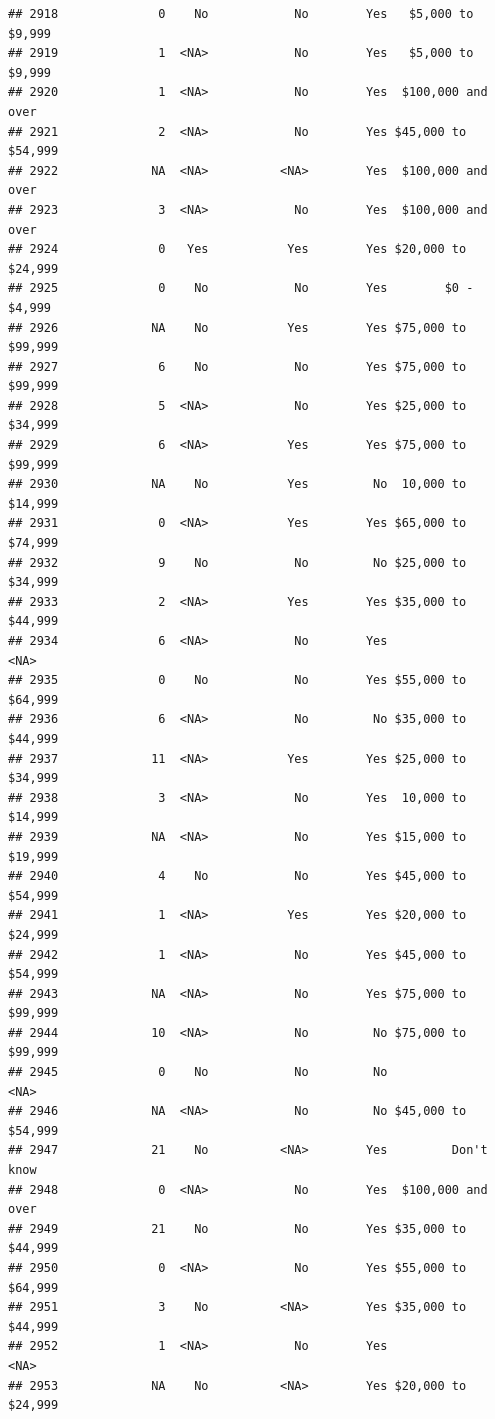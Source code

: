 \documentclass[man]{apa6}
\begin{document}
\begin{verbatim}
## 2918              0    No            No        Yes   $5,000 to $9,999
## 2919              1  <NA>            No        Yes   $5,000 to $9,999
## 2920              1  <NA>            No        Yes  $100,000 and over
## 2921              2  <NA>            No        Yes $45,000 to $54,999
## 2922             NA  <NA>          <NA>        Yes  $100,000 and over
## 2923              3  <NA>            No        Yes  $100,000 and over
## 2924              0   Yes           Yes        Yes $20,000 to $24,999
## 2925              0    No            No        Yes        $0 - $4,999
## 2926             NA    No           Yes        Yes $75,000 to $99,999
## 2927              6    No            No        Yes $75,000 to $99,999
## 2928              5  <NA>            No        Yes $25,000 to $34,999
## 2929              6  <NA>           Yes        Yes $75,000 to $99,999
## 2930             NA    No           Yes         No  10,000 to $14,999
## 2931              0  <NA>           Yes        Yes $65,000 to $74,999
## 2932              9    No            No         No $25,000 to $34,999
## 2933              2  <NA>           Yes        Yes $35,000 to $44,999
## 2934              6  <NA>            No        Yes               <NA>
## 2935              0    No            No        Yes $55,000 to $64,999
## 2936              6  <NA>            No         No $35,000 to $44,999
## 2937             11  <NA>           Yes        Yes $25,000 to $34,999
## 2938              3  <NA>            No        Yes  10,000 to $14,999
## 2939             NA  <NA>            No        Yes $15,000 to $19,999
## 2940              4    No            No        Yes $45,000 to $54,999
## 2941              1  <NA>           Yes        Yes $20,000 to $24,999
## 2942              1  <NA>            No        Yes $45,000 to $54,999
## 2943             NA  <NA>            No        Yes $75,000 to $99,999
## 2944             10  <NA>            No         No $75,000 to $99,999
## 2945              0    No            No         No               <NA>
## 2946             NA  <NA>            No         No $45,000 to $54,999
## 2947             21    No          <NA>        Yes         Don't know
## 2948              0  <NA>            No        Yes  $100,000 and over
## 2949             21    No            No        Yes $35,000 to $44,999
## 2950              0  <NA>            No        Yes $55,000 to $64,999
## 2951              3    No          <NA>        Yes $35,000 to $44,999
## 2952              1  <NA>            No        Yes               <NA>
## 2953             NA    No          <NA>        Yes $20,000 to $24,999

\end{verbatim}
\end{document}
